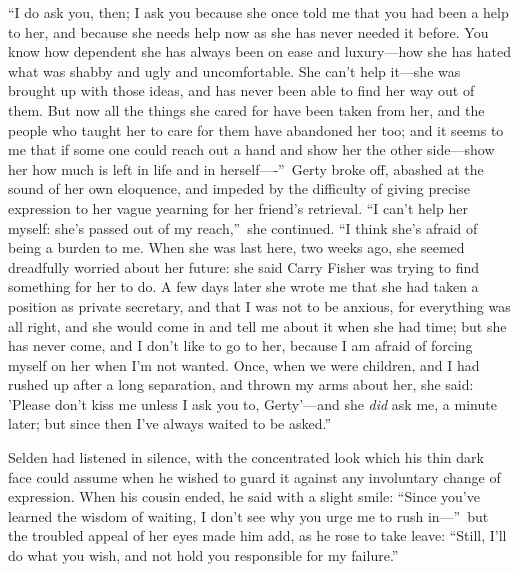 \documentclass[12pt,a4paper]{book}
\begin{document}
``I do ask you, then; I ask you because she once told me that you
had been a help to her, and because she needs help now as she has
never needed it before. You know how dependent she has always
been on ease and luxury---how she has hated what was shabby and
ugly and uncomfortable. She can't help it---she was brought up
with those ideas, and has never been able to find her way out of
them. But now all the things she cared for have been taken from
her, and the people who taught her to care for them have
abandoned her too; and it seems to me that if some one could
reach out a hand and show her the other side---show her how much
is left in life and in herself----''\ Gerty broke off, abashed at
the sound of her own eloquence, and impeded by the difficulty of
giving precise expression to her vague yearning for her friend's
retrieval. ``I can't help her myself: she's passed out of my
reach,''\ she continued. ``I think she's afraid of being a burden to
me. When she was last here, two weeks ago, she seemed dreadfully
worried about her future: she said Carry Fisher was trying to
find something for her to do. A few days later she wrote me that
she had taken a position as private secretary, and that I was not
to be anxious, for everything was all right, and she
would come in and tell me about it when she had time; but she has
never come, and I don't like to go to her, because I am afraid of
forcing myself on her when I'm not wanted. Once, when we were
children, and I had rushed up after a long separation, and thrown
my arms about her, she said: 'Please don't kiss me unless I ask
you to, Gerty'---and she \textit{did} ask me, a minute later; but since
then I've always waited to be asked.''





Selden had listened in silence, with the concentrated look which
his thin dark face could assume when he wished to guard it
against any involuntary change of expression. When his cousin
ended, he said with a slight smile: ``Since you've learned the
wisdom of waiting, I don't see why you urge me to rush in---''\ but
the troubled appeal of her eyes made him add, as he rose to take
leave: ``Still, I'll do what you wish, and not hold you
responsible for my failure.''
\end{document}
